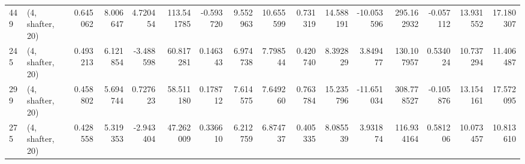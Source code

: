 \begin{tabular}{llrrrrrrrrrrrrrr}
449 &  (4, shafter, 20) &   0.645062 &   8.006647 &   4.720454 &   113.541785 &  -0.593720 &   9.552963 &  10.655599 &  0.731319 &  14.588191 & -10.053596 &   295.162932 & -0.057112 &  13.931552 &  17.180307 \\
245 &  (4, shafter, 20) &   0.493213 &   6.121854 &  -3.488598 &    60.817281 &   0.146343 &   6.974738 &   7.798544 &  0.420740 &   8.392829 &   3.849477 &   130.107957 &  0.534024 &  10.737294 &  11.406487 \\
299 &  (4, shafter, 20) &   0.458802 &   5.694744 &   0.727623 &    58.511180 &   0.178712 &   7.614575 &   7.649260 &  0.763784 &  15.235796 & -11.651034 &   308.778527 & -0.105876 &  13.154161 &  17.572095 \\
275 &  (4, shafter, 20) &   0.428558 &   5.319353 &  -2.943404 &    47.262009 &   0.336610 &   6.212759 &   6.874737 &  0.405335 &   8.085539 &   3.931874 &   116.934164 &  0.581206 &  10.073457 &  10.813610 \\
\bottomrule
\end{tabular}
